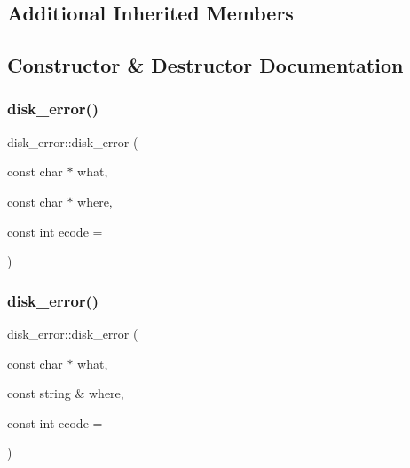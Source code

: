 \subsection*{Additional Inherited Members}


\subsection{Constructor \& Destructor Documentation}
\mbox{\label{classdisk__error_a2b3f22e37f13642df676c5eaf10526d3}} 
\subsubsection{\texorpdfstring{disk\+\_\+error()}{disk\_error()}\hspace{0.1cm}{\footnotesize\ttfamily [1/4]}}
{\footnotesize\ttfamily disk\+\_\+error\+::disk\+\_\+error (\begin{DoxyParamCaption}\item[{const char $\ast$}]{what,  }\item[{const char $\ast$}]{where,  }\item[{const int}]{ecode = {} }\end{DoxyParamCaption})}

\mbox{\label{classdisk__error_a0c883fc590a36b64bfb88b403637a89f}} 
\subsubsection{\texorpdfstring{disk\+\_\+error()}{disk\_error()}\hspace{0.1cm}{\footnotesize\ttfamily [2/4]}}
{\footnotesize\ttfamily disk\+\_\+error\+::disk\+\_\+error (\begin{DoxyParamCaption}\item[{const char $\ast$}]{what,  }\item[{const string \&}]{where,  }\item[{const int}]{ecode = {} }\end{DoxyParamCaption})}

\mbox{\label{classdisk__error_af7db4123b6989178ad42e577a94b053e}} 
